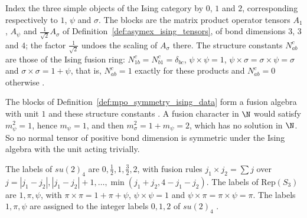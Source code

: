 \begin{definition}%
    \label{def:mpo_symmetry_ising_data}
    \leanok
    Index the three simple objects of the Ising category by $0$, $1$ and
    $2$, corresponding respectively to $1$, $\psi$ and $\sigma$. The blocks
    are the matrix product operator tensors $A_1$, $A_\psi$ and
    $\tfrac1{\sqrt2}A_\sigma$ of Definition~\ref{def:asymex_ising_tensors},
    of bond dimensions $3$, $3$ and $4$; the factor $\tfrac1{\sqrt2}$ undoes
    the scaling of $A_\sigma$ there. The structure constants $N_{ab}^c$ are
    those of the Ising fusion ring: $N_{1b}^c=N_{b1}^c=\delta_{bc}$,
    $\psi\times\psi=1$, $\psi\times\sigma=\sigma\times\psi=\sigma$ and
    $\sigma\times\sigma=1+\psi$, that is, $N_{ab}^c=1$ exactly for these
    products and $N_{ab}^c=0$ otherwise \cite{Bultinck2017Anyons}.
\end{definition}

\begin{example}[Ising]%
    \label{ex:mpo_symmetry_ising}
    \leanok
    The blocks of Definition~\ref{def:mpo_symmetry_ising_data} form a fusion
    algebra with unit $1$ and these structure constants
    \cite{Bultinck2017Anyons}. A fusion character
    in $\N$ would satisfy $m_\psi^2=1$, hence $m_\psi=1$, and then
    $m_\sigma^2=1+m_\psi=2$, which has no solution in $\N$. So no normal
    tensor of positive bond dimension is symmetric under the Ising algebra
    with the unit acting trivially.
\end{example}

\begin{definition}%
    \label{def:mposym_su24_reps3}
    \leanok
    The labels of $su(2)_4$ are $0,\tfrac12,1,\tfrac32,2$, with
    fusion rules $j_1\times j_2=\sum j$ over
    $j=|j_1-j_2|,|j_1-j_2|+1,\ldots,\min(j_1+j_2,4-j_1-j_2)$. The labels of
    $\mathrm{Rep}(S_3)$ are $1,\pi,\psi$, with
    $\pi\times\pi=1+\pi+\psi$, $\psi\times\psi=1$ and
    $\psi\times\pi=\pi\times\psi=\pi$. The labels $1,\pi,\psi$ are assigned
    to the integer labels $0,1,2$ of $su(2)_4$
    \cite[Section~6]{GarreRubio2023MPOSym}.
\end{definition}


